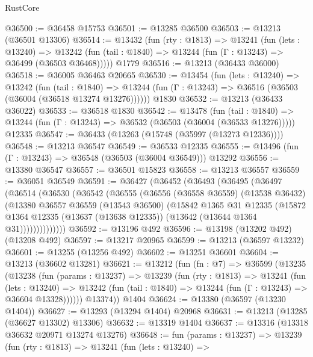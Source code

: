 \begin{lexlean}{RustCore}
\begin{coremodule}
@36500 := @36458 @15753
@36501 := @13285 @36500
@36503 := @13213 (@36501 @13306)
@36514 := @13432
    (fun (rty : @1813) =>
    @13241
      (fun (lets : @13240) =>
      @13242 (fun (tail : @1840) => @13244 (fun (Γ : @13243) => @36499 (@36503 @36468)))))
    @1779
@36516 := @13213 (@36433 @36000)
@36518 := @36005 @36463 @20665
@36530 := @13454
    (fun (lets : @13240) =>
    @13242
      (fun (tail : @1840) =>
      @13244 (fun (Γ : @13243) => @36516 (@36503 (@36004 (@36518 @13274 @13276))))))
    @1830
@36532 := @13213 (@36433 @36022)
@36533 := @36518 @1830
@36542 := @13478
    (fun (tail : @1840) => @13244 (fun (Γ : @13243) => @36532 (@36503 (@36004 (@36533 @13276)))))
    @12335
@36547 := @36433 (@13263 (@15748 (@35997 (@13273 @12336))))
@36548 := @13213 @36547
@36549 := @36533 @12335
@36555 := @13496 (fun (Γ : @13243) => @36548 (@36503 (@36004 @36549))) @13292
@36556 := @13380 @36547
@36557 := @36501 @15823
@36558 := @13213 @36557
@36559 := @36051 @36549
@36591 := @36427
    (@36452
      (@36493
        (@36495
          (@36497
            (@36514
              (@36530
                (@36542
                  (@36555
                    (@36556
                      (@36558 @36559)
                      (@13538 @36432)
                      (@13380
                        @36557
                        @36559
                        (@13543 @36500)
                        (@15842
                          @1365
                          @31
                          @12335
                          (@15872
                            @1364
                            @12335
                            (@13637 (@13638 @12335))
                            (@13642 (@13644 @1364 @31))))))))))))))
@36592 := @13196 @492
@36596 := @13198 (@13202 @492) (@13208 @492)
@36597 := @13217 @20965
@36599 := @13213 (@36597 @13232)
@36601 := @13255 (@13256 @492)
@36602 := @13251 @36601
@36604 := @13213 (@36602 @13281)
@36621 := @13212
    (fun (fn : @7) =>
    @36599
      (@13235
        (@13238
          (fun (params : @13237) =>
          @13239
            (fun (rty : @1813) =>
            @13241
              (fun (lets : @13240) =>
              @13242 (fun (tail : @1840) => @13244 (fun (Γ : @13243) => @36604 @13328))))))
        @13374))
    @1404
@36624 := @13380 (@36597 (@13230 @1404))
@36627 := @13293 (@13294 @1404) @20968
@36631 := @13213 (@13285 (@36627 @13302) @13306)
@36632 := @13319 @1404
@36637 := @13316 (@13318 @36632 @20971 @13274 @13276)
@36648 := fun (params : @13237) =>
  @13239
    (fun (rty : @1813) =>
    @13241
      (fun (lets : @13240) =>

\end{coremodule}
\end{lexlean}
